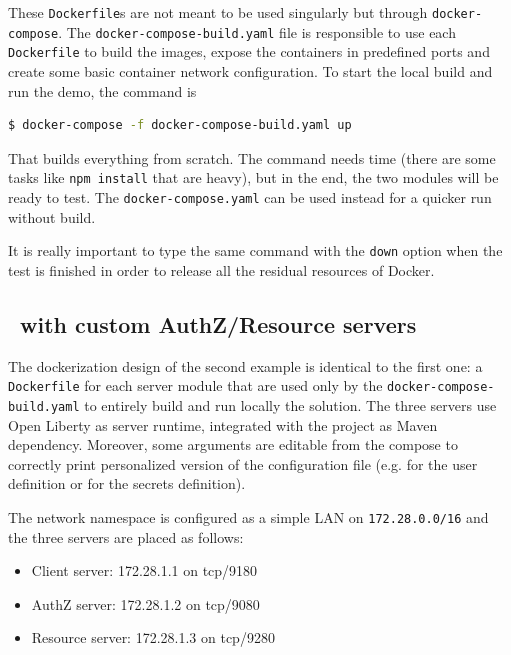 These \texttt{Dockerfile}s are not meant to be used singularly but through \texttt{docker-compose}. The \texttt{docker-compose-build.yaml} file is responsible to use each \texttt{Dockerfile} to build the images, expose the containers in predefined ports and create some basic container network configuration. To start the local build and run the demo, the command is

\begin{lstlisting}[language=bash, basicstyle=\fontsize{12}{14}\ttfamily]
  $ docker-compose -f docker-compose-build.yaml up
\end{lstlisting}

\noindent That builds everything from scratch. The command needs time (there are some tasks like \texttt{npm install} that are heavy), but in the end, the two modules will be ready to test. The \texttt{docker-compose.yaml} can be used instead for a 
quicker run without build.

It is really important to type the same command with the \texttt{down} option when the test is finished in order to release all the residual resources of Docker.

\subsection{\oauth\ with custom AuthZ/Resource servers}
The dockerization design of the second example is identical to the first one: a \texttt{Dockerfile} for each server module that are used only by the \texttt{docker-compose-build.yaml} to entirely build and run locally the solution. The three servers use Open Liberty as server runtime, integrated with the project as Maven dependency. Moreover, some arguments are editable from the compose to correctly print personalized version of the configuration file (e.g. for the user definition or for the secrets definition).

The network namespace is configured as a simple LAN on \texttt{172.28.0.0/16} and the three servers are placed as follows:

\begin{itemize}
    \item Client server: 172.28.1.1 on tcp/9180
    \item AuthZ server: 172.28.1.2 on tcp/9080
    \item Resource server: 172.28.1.3 on tcp/9280
\end{itemize}


